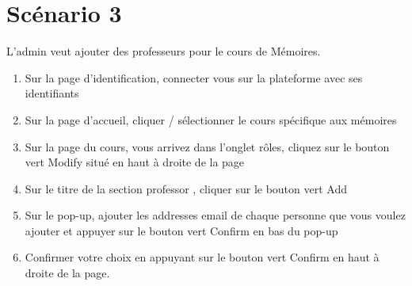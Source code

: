 \documentclass[a4paper, 11pt]{article}
\begin{document}
\section*{Scénario 3}
L'admin veut ajouter des professeurs pour le cours de Mémoires.

\begin{tcolorbox}
    \begin{enumerate}
        \item Sur la page d'identification, connecter vous sur la plateforme avec ses identifiants
        \item Sur la page d'accueil, cliquer / sélectionner le cours spécifique aux mémoires
        \item Sur la page du cours, vous arrivez dans l'onglet rôles, cliquez sur le bouton vert \og Modify\fg{} situé en haut à droite de la page
        \item Sur le titre de la section \og professor \fg{} , cliquer sur le bouton vert \og Add\fg{}
        \item Sur le pop-up, ajouter les addresses email de chaque personne que vous voulez ajouter et appuyer sur le bouton vert \og Confirm\fg{} en bas du pop-up
        \item Confirmer votre choix en appuyant sur le bouton vert \og Confirm\fg{} en haut à droite de la page.
    \end{enumerate}
\end{tcolorbox}
\end{document}
